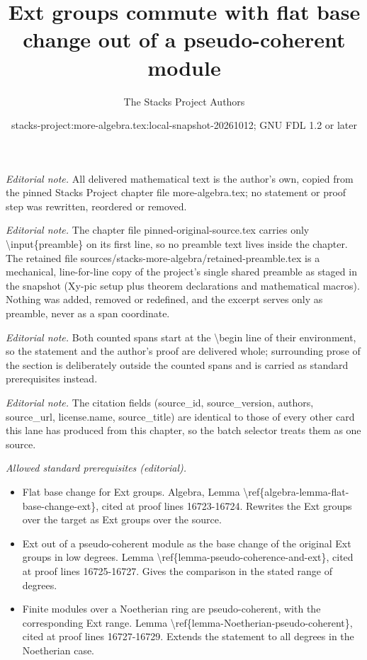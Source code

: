 \documentclass[10pt,a4paper]{amsart}
\title{Ext groups commute with flat base change out of a pseudo-coherent module}
\author{The Stacks Project Authors}
\date{stacks-project:more-algebra.tex:local-snapshot-20261012; GNU FDL 1.2 or later}
\theoremstyle{plain}
\theoremstyle{definition}
\theoremstyle{remark}
\numberwithin{equation}{subsection}
\begin{document}
\maketitle
\setcounter{subsection}{1}
\noindent\textit{Editorial note.} All delivered mathematical text is the author's own, copied from the pinned Stacks Project chapter file more-algebra.tex; no statement or proof step was rewritten, reordered or removed.\par\medskip
\noindent\textit{Editorial note.} The chapter file pinned-original-source.tex carries only \textbackslash{}input\{preamble\} on its first line, so no preamble text lives inside the chapter. The retained file sources/stacks-more-algebra/retained-preamble.tex is a mechanical, line-for-line copy of the project's single shared preamble as staged in the snapshot (Xy-pic setup plus theorem declarations and mathematical macros). Nothing was added, removed or redefined, and the excerpt serves only as preamble, never as a span coordinate.\par\medskip
\noindent\textit{Editorial note.} Both counted spans start at the \textbackslash{}begin line of their environment, so the statement and the author's proof are delivered whole; surrounding prose of the section is deliberately outside the counted spans and is carried as standard prerequisites instead.\par\medskip
\noindent\textit{Editorial note.} The citation fields (source\_id, source\_version, authors, source\_url, license.name, source\_title) are identical to those of every other card this lane has produced from this chapter, so the batch selector treats them as one source.\par\medskip
\noindent\textit{Allowed standard prerequisites (editorial).}\begin{itemize}
\item Flat base change for Ext groups. Algebra, Lemma \textbackslash{}ref\{algebra-lemma-flat-base-change-ext\}, cited at proof lines 16723-16724. Rewrites the Ext groups over the target as Ext groups over the source.
\item Ext out of a pseudo-coherent module as the base change of the original Ext groups in low degrees. Lemma \textbackslash{}ref\{lemma-pseudo-coherence-and-ext\}, cited at proof lines 16725-16727. Gives the comparison in the stated range of degrees.
\item Finite modules over a Noetherian ring are pseudo-coherent, with the corresponding Ext range. Lemma \textbackslash{}ref\{lemma-Noetherian-pseudo-coherent\}, cited at proof lines 16727-16729. Extends the statement to all degrees in the Noetherian case.
\end{itemize}\medskip
\end{document}
